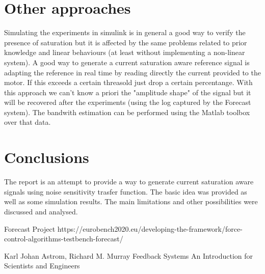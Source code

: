 \documentclass[a4paper,11pt]{article}
\begin{document}
\section{Other approaches}

Simulating the experiments in simulink is in general a good way to verify the presence of saturation but it is affected by the same problems related to prior knowledge and linear behaviours (at least without implementing a non-linear system). A good way to generate a current saturation aware reference signal is adapting the reference in real time by reading directly the current provided to the motor. If this exceeds a certain threasold just drop a certain percentange. With this approach we can't know a priori the "amplitude shape" of the signal but it will be recovered after the experiments (using the log captured by the Forecast system). The bandwith estimation can be performed using the Matlab toolbox over that data.

\section{Conclusions}
The report is an attempt to provide a way to generate current saturation aware signals using noise sensitivity trasfer function. The basic idea was provided as well as some simulation results. The main limitations and other possibilities were discussed and analysed.

\begin{thebibliography}{9}

Forecast Project https://eurobench2020.eu/developing-the-framework/force-control-algorithms-testbench-forecast/

Karl Johan Astrom, Richard M. Murray Feedback Systems An Introduction for Scientists and Engineers
\end{thebibliography}
\end{document}

